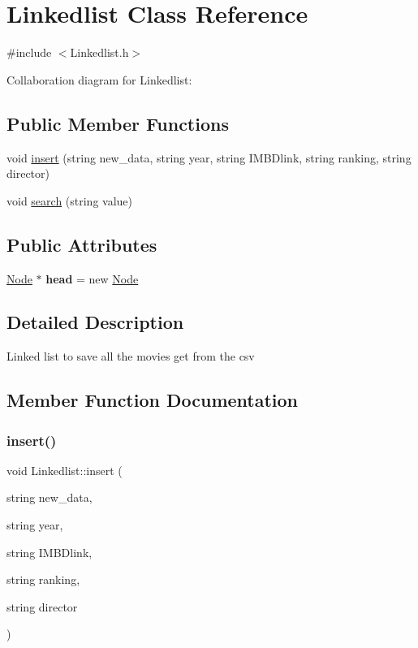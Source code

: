 \hypertarget{classLinkedlist}{}\section{Linkedlist Class Reference}
\label{classLinkedlist}


{\ttfamily \#include $<$Linkedlist.\+h$>$}



Collaboration diagram for Linkedlist\+:
\subsection*{Public Member Functions}
\begin{DoxyCompactItemize}
\item 
void \hyperlink{classLinkedlist_aecfdea55f47b4cbafe133f369a365d05}{insert} (string new\+\_\+data, string year, string I\+M\+B\+Dlink, string ranking, string director)
\item 
void \hyperlink{classLinkedlist_a7c1e0cce43f358b38099bd1954456ad9}{search} (string value)
\end{DoxyCompactItemize}
\subsection*{Public Attributes}
\begin{DoxyCompactItemize}
\item 
\mbox{\label{classLinkedlist_aae08a12e77164b25e993b0791c5aa7e0}} 
\hyperlink{classNode}{Node} $\ast$ {\bfseries head} = new \hyperlink{classNode}{Node}
\end{DoxyCompactItemize}


\subsection{Detailed Description}
Linked list to save all the movies get from the csv 

\subsection{Member Function Documentation}
\mbox{\label{classLinkedlist_aecfdea55f47b4cbafe133f369a365d05}} 
\subsubsection{\texorpdfstring{insert()}{insert()}}
{\footnotesize\ttfamily void Linkedlist\+::insert (\begin{DoxyParamCaption}\item[{string}]{new\+\_\+data,  }\item[{string}]{year,  }\item[{string}]{I\+M\+B\+Dlink,  }\item[{string}]{ranking,  }\item[{string}]{director }\end{DoxyParamCaption})\hspace{0.3cm}{\ttfamily [inline]}}

